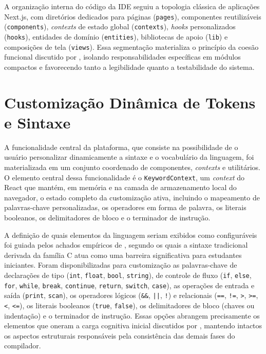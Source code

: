 A organização interna do código da IDE seguiu a topologia clássica de aplicações Next.js, com diretórios dedicados para páginas (\texttt{pages}), componentes reutilizáveis (\texttt{components}), \textit{contexts} de estado global (\texttt{contexts}), \textit{hooks} personalizados (\texttt{hooks}), entidades de domínio (\texttt{entities}), bibliotecas de apoio (\texttt{lib}) e composições de tela (\texttt{views}). Essa segmentação materializa o princípio da coesão funcional discutido por , isolando responsabilidades específicas em módulos compactos e favorecendo tanto a legibilidade quanto a testabilidade do sistema.

\section{Customização Dinâmica de Tokens e Sintaxe}
\label{sec:customizacao-dinamica}

A funcionalidade central da plataforma, que consiste na possibilidade de o usuário personalizar dinamicamente a sintaxe e o vocabulário da linguagem, foi materializada em um conjunto coordenado de componentes, \textit{contexts} e utilitários. O elemento central dessa funcionalidade é o \texttt{KeywordContext}, um \textit{context} do React que mantém, em memória e na camada de armazenamento local do navegador, o estado completo da customização ativa, incluindo o mapeamento de palavras-chave personalizadas, os operadores em forma de palavra, os literais booleanos, os delimitadores de bloco e o terminador de instrução.

A definição de quais elementos da linguagem seriam exibidos como configuráveis foi guiada pelos achados empíricos de , segundo os quais a sintaxe tradicional derivada da família C atua como uma barreira significativa para estudantes iniciantes. Foram disponibilizadas para customização as palavras-chave de declarações de tipo (\texttt{int}, \texttt{float}, \texttt{bool}, \texttt{string}), de controle de fluxo (\texttt{if}, \texttt{else}, \texttt{for}, \texttt{while}, \texttt{break}, \texttt{continue}, \texttt{return}, \texttt{switch}, \texttt{case}), as operações de entrada e saída (\texttt{print}, \texttt{scan}), os operadores lógicos (\texttt{\&\&}, \texttt{||}, \texttt{!}) e relacionais (\texttt{==}, \texttt{!=}, \texttt{>}, \texttt{>=}, \texttt{<}, \texttt{<=}), os literais booleanos (\texttt{true}, \texttt{false}), os delimitadores de bloco (chaves ou indentação) e o terminador de instrução. Essas opções abrangem precisamente os elementos que oneram a carga cognitiva inicial discutidos por , mantendo intactos os aspectos estruturais responsáveis pela consistência das demais fases do compilador.

